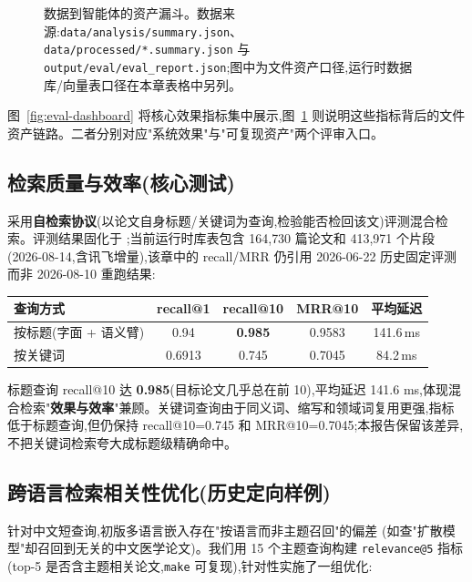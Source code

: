 \begin{figure}[!htbp]
\centering
{}
\caption{数据到智能体的资产漏斗。数据来源:\texttt{data/analysis/summary.json}、\texttt{data/processed/*.summary.json} 与 \texttt{output/eval/eval\_report.json};图中为文件资产口径,运行时数据库/向量表口径在本章表格中另列。}
\label{fig:asset-funnel}
\end{figure}

图~\ref{fig:eval-dashboard} 将核心效果指标集中展示,图~\ref{fig:asset-funnel} 则说明这些指标背后的文件资产链路。二者分别对应"系统效果"与"可复现资产"两个评审入口。

\subsection{检索质量与效率(核心测试)}
采用\textbf{自检索协议}(以论文自身标题/关键词为查询,检验能否检回该文)评测混合检索。评测结果固化于 ;当前运行时库表包含 164{,}730 篇论文和 413{,}971 个片段(2026-08-14,含讯飞增量),该章中的 recall/MRR 仍引用 2026-06-22 历史固定评测而非 2026-08-10 重跑结果:

\begin{tableblock}
\begin{tabularx}{0.94\textwidth}{Xcccc}
\toprule
\textbf{查询方式} & \textbf{recall@1} & \textbf{recall@10} & \textbf{MRR@10} & \textbf{平均延迟} \\
\midrule
按标题(字面 + 语义臂) & 0.94 & \textbf{0.985} & 0.9583 & 141.6\,ms \\
按关键词 & 0.6913 & 0.745 & 0.7045 & 84.2\,ms \\
\bottomrule
\end{tabularx}
\end{tableblock}

标题查询 recall@10 达 \textbf{0.985}(目标论文几乎总在前 10),平均延迟 141.6 ms,体现混合检索"\textbf{效果与效率}"兼顾。关键词查询由于同义词、缩写和领域词复用更强,指标低于标题查询,但仍保持 recall@10=0.745 和 MRR@10=0.7045;本报告保留该差异,不把关键词检索夸大成标题级精确命中。

\subsection{跨语言检索相关性优化(历史定向样例)}
针对中文短查询,初版多语言嵌入存在"按语言而非主题召回"的偏差
(如查"扩散模型"却召回到无关的中文医学论文)。我们用 15 个主题查询构建
\texttt{relevance@5} 指标(top-5 是否含主题相关论文,\texttt{make} 可复现),针对性实施了一组优化:

